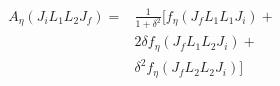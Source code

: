 
\begin{equation}
\begin{aligned}
A_\eta(J_i L_1 L_2 J_f) ={} & \frac{1}{1+\delta^2}[f_\eta(J_f L_1 L_1 J_i)+ \\
					     & 2\delta f_\eta (J_f L_1 L_2 J_i)+     \\
                         & \delta^2 f_\eta (J_f L_2 L_2 J_i)]
\end{aligned}
\label{equation: angular distribution coefficient}
\end{equation}



